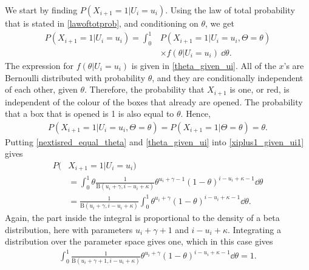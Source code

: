 We start by finding $P(X_{i+1}=1|U_i=u_i)$. Using the law of total probability that is stated in \eqref{lawoftotprob}, and conditioning on $\theta$, we get
\begin{equation}
\label{xiplus1_given_ui1}
    \begin{aligned}
        P(X_{i+1}=1|U_i=u_i)
        = \int_0^1 & P(X_{i+1}=1|U_i=u_i,\Theta=\theta)\\[6pt]
        &\times f(\theta|U_i=u_i)\: \dd \theta.
    \end{aligned}
\end{equation}
The expression for $f(\theta|U_i=u_i)$ is given in \eqref{theta_given_ui}. All of the $x$'s are Bernoulli distributed with probability $\theta$, and they are conditionally independent of each other, given $\theta$. Therefore, the probability that $X_{i+1}$ is one, or red, is independent of the colour of the boxes that already are opened. The probability that a box that is opened is 1 is also equal to $\theta$. Hence,
\begin{equation}
\label{nextisred_equal_theta}
    \begin{aligned}
        P(X_{i+1}=1|U_i=u_i,\Theta=\theta) = P(X_{i+1}=1|\Theta=\theta) = \theta.
    \end{aligned}
\end{equation}
Putting \eqref{nextisred_equal_theta} and \eqref{theta_given_ui} into \eqref{xiplus1_given_ui1} gives
\begin{equation}
\label{xiplus1_given_ui2}
    \begin{aligned}
        P(&X_{i+1}=1|U_i=u_i)\\
        &= \int_0^1 \theta \frac{1}{\text{B}(u_i+\gamma,i-u_i+\kappa)}\theta^{u_i+\gamma-1}(1-\theta)^{i-u_i+\kappa-1}  \dd \theta\\[6pt]
        &=\frac{1}{\text{B}(u_i+\gamma,i-u_i+\kappa)} \int_0^1 \theta^{u_i+\gamma}(1-\theta)^{i-u_i+\kappa-1} \dd \theta.
    \end{aligned}
\end{equation}
Again, the part inside the integral is proportional to the density of a beta distribution, here with parameters $u_i+\gamma+1$ and $i-u_i+\kappa$. Integrating a distribution over the parameter space gives one, which in this case gives
\begin{equation*}
    \begin{aligned}
        \int_0^1 \frac{1}{\text{B}(u_i+\gamma+1,i-u_i+\kappa)} \theta^{u_i+\gamma}(1-\theta)^{i-u_i+\kappa-1}  \dd \theta = 1.
    \end{aligned}
\end{equation*}
